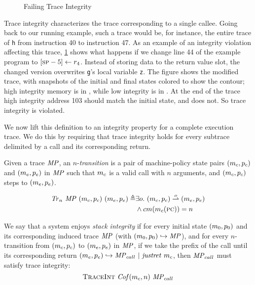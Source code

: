 \documentclass[acmsmall,review,anonymous]{acmart}\settopmatter{printfolios=true,printccs=false,printacmref=false}
\begin{document}
{\begin{figure}
  \integrityexample
  \caption{Failing Trace Integrity}
  \label{fig:intex}
\end{figure}

Trace integrity characterizes the trace corresponding to a single
callee.
Going back to our running example, such a trace would be, for
instance, the entire trace of {\tt h} from instruction 40 to
instruction 47.
As an example of an integrity violation affecting this trace, \cref{fig:intex} shows what happens
if we change line 44 of the example program to $[\textsc{sp} - 5] \leftarrow r_4$.
Instead of storing data to the return value slot,
the changed version overwrites {\tt g}'s local variable {\tt z}.
The figure shows the modified trace, with snapshots of the initial
and final states colored to show the contour; high
integrity memory is in \high, while low integrity is in \low.
At the end of the trace high integrity address 103 should match the initial
state, and does not. So trace integrity is violated.

We now lift this definition to an integrity property for a complete
execution trace. We do this by requiring that trace integrity holds
for every subtrace delimited by a call and its corresponding return.

 Given a trace \(\mathit{MP}\), %
an \(n\)-{\em transition} is a pair of
machine-policy state pairs \((m_c,p_c)\) and
\((m_e,p_e)\) in \(\mathit{MP}\) such that
\(m_c\) is a valid call with \(n\) arguments, and
\((m_c,p_c)\) steps to \((m_e,p_e)\).


  \[\begin{split}
    \mathit{Tr}_n ~ \mathit{MP} ~ (m_c,p_c) ~ (m_e,p_e)
    \triangleq & \exists o.
    ~ (m_c,p_c) \overset{o}{\rightharpoonup} (m_e,p_e) \\
    & \land cm(m_c(\textsc{pc})) = n
  \end{split}\]


We say that a system enjoys {\em stack integrity} if for every initial
state $(m_0,p_0)$ and its corresponding induced trace $\mathit{MP}$ (with
$(m_0,p_0) \hookrightarrow \mathit{MP}$), and for every
$n$-transition from $(m_c,p_c)$ to
$(m_e,p_e)$ in $\mathit{MP}$, if we take the prefix of the
call until its corresponding return $(m_e,p_e)
\hookrightarrow \mathit{MP}_{call} ~ | ~ \mathit{justret}\ m_c$, then $\mathit{MP}_{call}$ must
satisfy trace integrity:
\[\text{\sc TraceInt} ~ \mathit{Cof}(m_c,n) ~ \mathit{MP}_{call}\]

}
\end{document}
